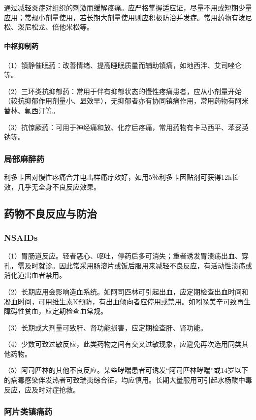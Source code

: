 通过减轻炎症对组织的刺激而缓解疼痛。应严格掌握适应证，尽量不用或短期少量应用；常规小剂量使用，若长期大剂量使用则应积极防治并发症。常用药物有泼尼松、泼尼松龙、倍他米松等。
\paragraph{中枢抑制药}

（1）镇静催眠药：改善情绪、提高睡眠质量而辅助镇痛，如地西泮、艾司唑仑等。

（2）三环类抗抑郁药：常用于伴有抑郁状态的慢性疼痛患者，应从小剂量开始（较抗抑郁作用剂量小、显效早），无抑郁者亦有协同镇痛作用，常用药物有阿米替林、氟西汀等。

（3）抗惊厥药：可用于神经痛和放、化疗后疼痛，常用药物有卡马西平、苯妥英钠等。

\subsubsection{局部麻醉药}

利多卡因对慢性疼痛合并电击样痛疗效好，如用5％利多卡因贴剂可获得12h长效，几乎无全身不良反应效果。

\subsection{药物不良反应与防治}

\subsubsection{NSAIDs}

（1）胃肠道反应。轻者恶心、呕吐，停药后多可消失；重者诱发胃溃疡出血、穿孔，需及时就诊。因此常采用肠溶片或饭后服用来减轻不良反应，有活动性溃疡或消化道出血者禁用。

（2）长期应用会影响造血系统。如阿司匹林可引起出血，应定期检查出血时间和凝血时间，可用维生素K预防，有出血倾向者应停用或禁用。如吲哚美辛可致再生障碍性贫血，应定期检查血常规。

（3）长期或大剂量可致肝、肾功能损害，应定期检查肝、肾功能。

（4）少数可致过敏反应，此类药物之间有交叉过敏现象，应避免再次选用同类其他药物。

（5）阿司匹林的其他不良反应。某些哮喘患者可诱发“阿司匹林哮喘”或14岁以下的病毒感染伴发热者可致瑞夷综合征，均应慎用。长期大量服用可引起水杨酸中毒反应，应及时对症抢救。

\subsubsection{阿片类镇痛药}
